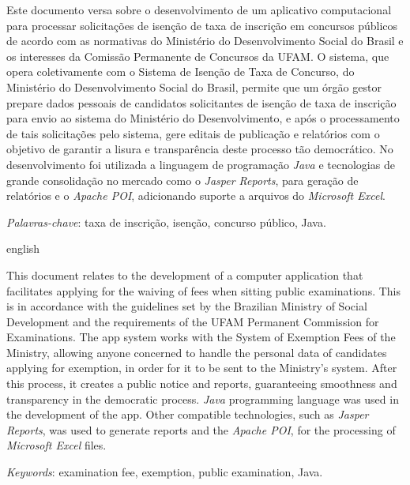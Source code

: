 \documentclass[
	12pt,			%
	openright,		%
	oneside,	
	a4paper,		%
	english,		%
	brazil			%
]{abntex2/abntex2}  %
\begin{document}

\setlength{\absparsep}{18pt} %
\begin{resumo}

	Este documento versa sobre o desenvolvimento de um aplicativo computacional para processar solicitações de isenção de taxa de inscrição em concursos públicos de acordo com as normativas do Ministério do Desenvolvimento Social do Brasil e os interesses da Comissão Permanente de Concursos da UFAM. O sistema, que opera coletivamente com o Sistema de Isenção de Taxa de Concurso, do Ministério do Desenvolvimento Social do Brasil, permite que um órgão gestor prepare dados pessoais de candidatos solicitantes de isenção de taxa de inscrição para envio ao sistema do Ministério do Desenvolvimento, e após o processamento de tais solicitações pelo sistema, gere editais de publicação e relatórios com o objetivo de garantir a lisura e transparência deste processo tão democrático. No desenvolvimento foi utilizada a linguagem de programação \textit{Java} e tecnologias de grande consolidação no mercado como o \textit{Jasper Reports}, para geração de relatórios e o \textit{Apache POI}, adicionando suporte a arquivos do \textit{Microsoft Excel}.

	\vspace{\onelineskip}

	\noindent
	\textit{Palavras-chave}: taxa de inscrição, isenção, concurso público, Java.

\end{resumo}

\begin{abstracteng}[Abstract]
 \begin{otherlanguage*}{english}
 	
 	This document relates to the development of a computer application that facilitates applying for the waiving of fees when sitting public examinations. This is in accordance with the guidelines set by the Brazilian Ministry of Social Development and the requirements of the UFAM Permanent Commission for Examinations. The app system works with the System of Exemption Fees of the Ministry, allowing anyone concerned to handle the personal data of candidates applying for exemption, in order for it to be sent to the Ministry's system. After this process, it creates a public notice and reports, guaranteeing smoothness and transparency in the democratic process. \textit{Java} programming language was used in the development of the app. Other compatible technologies, such as \textit{Jasper Reports}, was used to generate reports and the \textit{Apache POI}, for the processing of \textit{Microsoft Excel} files.

   \vspace{\onelineskip}
 
   \noindent 
   \textit{Keywords}: examination fee, exemption, public examination, Java.
   
 \end{otherlanguage*}
\end{abstracteng}
\end{document}

